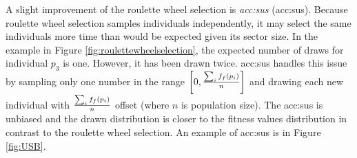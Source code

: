 A slight improvement of the roulette wheel selection is \emph{\acrlong*{acc:sus}} (\acrshort{acc:sus}). Because roulette wheel selection samples individuals independently, it may select the same individuals more time than would be expected given its sector size. In the example in Figure \ref{fig:roulettewheelselection}, the expected number of draws for individual $p_3$ is one. However, it has been drawn twice. \acrlong{acc:sus} handles this issue by sampling only one number in the range $\left[0,\frac{\sum_if_f(p_i)}{n} \right]$ and drawing each new individual with $\frac{\sum_if_f(p_i)}{n}$ offset (where $n$ is population size). The \acrshort{acc:sus} is unbiased and the drawn distribution is closer to the fitness values distribution in contrast to the roulette wheel selection. An example of \acrshort{acc:sus} is in Figure \ref{fig:USB}.

